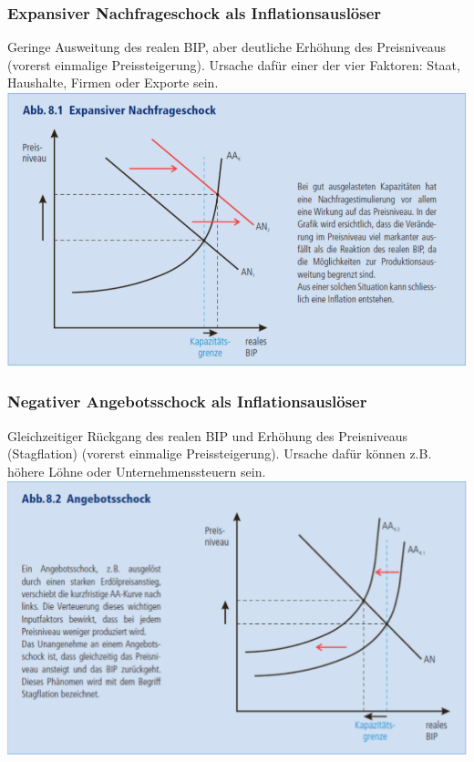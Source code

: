 \begin{multicols}{2}
\subsubsection{Expansiver Nachfrageschock als Inflationsauslöser}
Geringe Ausweitung des realen BIP, aber deutliche Erhöhung des Preisniveaus (vorerst einmalige Preissteigerung). Ursache dafür einer der vier Faktoren: Staat, Haushalte, Firmen oder Exporte sein.
\includegraphics[width=\linewidth]{images/nachfrageschock.png}
\columnbreak
\subsubsection{Negativer Angebotsschock als Inflationsauslöser}
Gleichzeitiger Rückgang des realen BIP und Erhöhung des Preisniveaus (Stagflation) (vorerst einmalige Preissteigerung). Ursache dafür können z.B. höhere Löhne oder Unternehmenssteuern sein.
\includegraphics[width=\linewidth]{images/angebotsschock.png}
\end{multicols}

